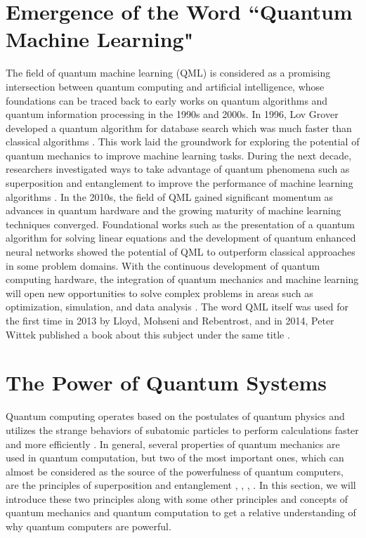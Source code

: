 \documentclass[conference]{IEEEtran}
\begin{document}
\section{Emergence of the Word “Quantum Machine Learning"}
The field of quantum machine learning (QML) is considered as a promising intersection between quantum computing and artificial intelligence, whose foundations can be traced back to early works on quantum algorithms and quantum information processing in the 1990s and 2000s. In 1996, Lov Grover developed a quantum algorithm for database search which was much faster than classical algorithms \cite{b9}. This work laid the groundwork for exploring the potential of quantum mechanics to improve machine learning tasks. During the next decade, researchers investigated ways to take advantage of quantum phenomena such as superposition and entanglement to improve the performance of machine learning algorithms \cite{b10}. In the 2010s, the field of QML gained significant momentum as advances in quantum hardware and the growing maturity of machine learning techniques converged. Foundational works such as the presentation of a quantum algorithm for solving linear equations \cite{b11} and the development of quantum enhanced neural networks \cite{b12} showed the potential of QML to outperform classical approaches in some problem domains. With the continuous development of quantum computing hardware, the integration of quantum mechanics and machine learning will open new opportunities to solve complex problems in areas such as optimization, simulation, and data analysis \cite{b13}. The word QML itself was used for the first time in 2013 by Lloyd, Mohseni and Rebentrost, and in 2014, Peter Wittek published a book about this subject under the same title \cite{b14}.

\section{The Power of Quantum Systems}
Quantum computing operates based on the postulates of quantum physics and utilizes the strange behaviors of subatomic particles to perform calculations faster and more efficiently \cite{b15}. In general, several properties of quantum mechanics are used in quantum computation, but two of the most important ones, which can almost be considered as the source of the powerfulness of quantum computers, are the principles of superposition and entanglement \cite{b15}, \cite{b16}, \cite{b16}, \cite{b18}. In this section, we will introduce these two principles along with some other principles and concepts of quantum mechanics and quantum computation to get a relative understanding of why quantum computers are powerful.
\end{document}
